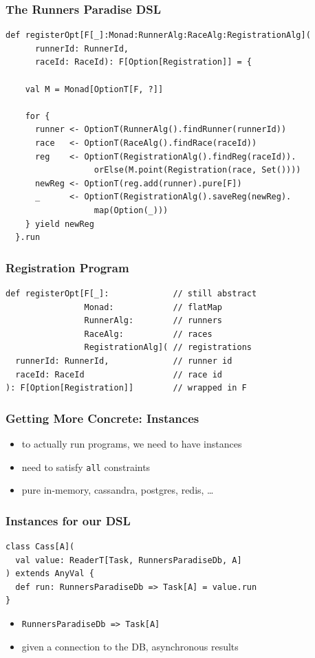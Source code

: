 \documentclass{beamer}
\begin{document}
\begin{frame}[fragile]
  \frametitle{The Runners Paradise DSL}
\begin{verbatim}
def registerOpt[F[_]:Monad:RunnerAlg:RaceAlg:RegistrationAlg](
      runnerId: RunnerId,
      raceId: RaceId): F[Option[Registration]] = {

    val M = Monad[OptionT[F, ?]]

    for {
      runner <- OptionT(RunnerAlg().findRunner(runnerId))
      race   <- OptionT(RaceAlg().findRace(raceId))
      reg    <- OptionT(RegistrationAlg().findReg(raceId)).
                  orElse(M.point(Registration(race, Set())))
      newReg <- OptionT(reg.add(runner).pure[F])
      _      <- OptionT(RegistrationAlg().saveReg(newReg).
                  map(Option(_)))
    } yield newReg
  }.run
\end{verbatim}
\end{frame}

\begin{frame}[fragile]
  \frametitle{Registration Program}
\begin{verbatim}
def registerOpt[F[_]:             // still abstract
                Monad:            // flatMap
                RunnerAlg:        // runners
                RaceAlg:          // races
                RegistrationAlg]( // registrations
  runnerId: RunnerId,             // runner id
  raceId: RaceId                  // race id
): F[Option[Registration]]        // wrapped in F
\end{verbatim}
\end{frame}

\begin{frame}
  \frametitle{Getting More Concrete: Instances}
  \begin{itemize}
  \item to actually run programs, we need to have instances
  \item need to satisfy \texttt{all} constraints
  \item pure in-memory, cassandra, postgres, redis, \dots{}
  \end{itemize}
\end{frame}

\begin{frame}
  \frametitle{Instances for our DSL}
\begin{verbatim}
class Cass[A](
  val value: ReaderT[Task, RunnersParadiseDb, A]
) extends AnyVal {
  def run: RunnersParadiseDb => Task[A] = value.run
}
\end{verbatim}
  \begin{itemize}
  \item \texttt{RunnersParadiseDb => Task[A]}
  \item given a connection to the DB, asynchronous results
  \end{itemize}
\end{frame}
\end{document}
